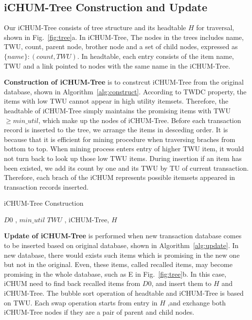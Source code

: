\documentclass[runningheads,a4paper]{llncs}
\begin{document}
\subsection{iCHUM-Tree Construction and Update}
Our iCHUM-Tree consists of tree structure and its headtable $ H $ for traversal, shown in Fig.~\ref{fig:tree}a. In iCHUM-Tree, The nodes in the trees includes name, TWU, count, parent node, brother node and a set of child nodes, expressed as $ \{ name\}:(count, TWU) $. In headtable, each entry consists of the item name, TWU and a link pointed to nodes with the same name in the iCHUM-Tree. 

\textbf{Construction of iCHUM-Tree} is to constrcut iCHUM-Tree from the original database, shown in Algorithm~\ref{alg:construct}. According to TWDC property, the items with low TWU cannot appear in high utility itemsets. Therefore, the headtable of iCHUM-Tree simply maintains the promising items with TWU $ \geqslant min\_util $, which make up the nodes of iCHUM-Tree. Before each transaction record is inserted to the tree, we arrange the items in desceding order. It is because that it is efficient for mining procedure when traversing braches from bottom to top. When mining process enters entry of higher TWU item, it would not turn back to look up those low TWU items. During insertion if an item has been existed, we add its count by one and its TWU by TU of current transaction. Therefore, each brach of the iCHUM represents possible itemsets appeared in transaction records inserted.

\begin{algorithm}
\caption{iCHUM-Tree Construction}
\begin{algorithmic}
\REQUIRE  $ D0 $ ,  $ min\_util $
\ENSURE  $ TWU $ , iCHUM-Tree, $ H $
\STATE{}
\ENDIF
\ENDFOR
\ENDFOR
\end{algorithmic}
\label{alg:construct}
\end{algorithm}

\textbf{Update of iCHUM-Tree} is performed when new transaction database comes to be inserted based on original database, shown in Algorithm~\ref{alg:update}. In new database, there would exists such items which is promising in the new one but not in the original. Even, these items, called recalled items, may become promising in the whole database, such as E in Fig.~\ref{fig:tree}b. In this case, iCHUM need to find back recalled items from $ D0 $, and insert them to $ H $ and iCHUM-Tree.  The bubble sort operation of headtable and iCHUM-Tree is based on TWU. Each swap operation starts from entry in $ H $ ,and exchange both iCHUM-Tree nodes if they are a pair of parent and child nodes.
\end{document}
